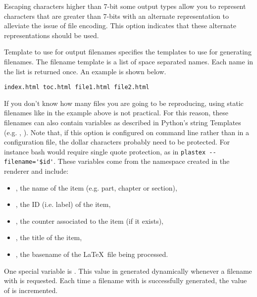 \begin{configuration}{Escaping characters higher than 7-bit}
some output types allow you to represent characters that are greater than
7-bits with an alternate representation to alleviate the issue of
file encoding.  This option indicates that these alternate representations
should be used.

\end{configuration}

\begin{configuration}{Template to use for output filenames}
specifies the templates to use for generating filenames.
The filename template is a list of space separated names.  Each name
in the list is returned once.  An example is shown below.

\begin{verbatim}
index.html toc.html file1.html file2.html
\end{verbatim}

If you don't know how many files you are going to be reproducing,
using static filenames like in the example above is not practical.
For this reason, these filenames can also contain variables as described in
Python's string Templates (e.g. , ).
Note that, if this option is configured on command line
rather than in a configuration file, the dollar characters probably need
to be protected. For instance bash would require single quote
protection, as in \verb+plastex --filename='$id'+.
These variables come from the namespace created in the renderer and
include:
\begin{itemize}
\item
{}, the name of the item (e.g. part, chapter or section),
\item
{}, the ID (i.e. label) of the item,
\item
{}, the counter associated to the item (if it exists),
\item
{}, the title of the item,
\item
{}, the basename of the \LaTeX\ file being processed.
\end{itemize}
One special variable is .  This value in generated dynamically
whenever a filename with  is requested.  Each time a filename
with  is successfully generated, the value of 
is incremented.


\end{configuration}
